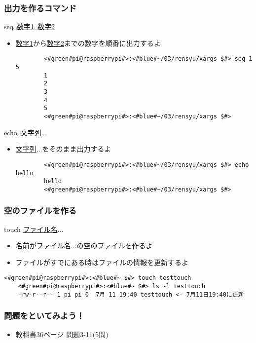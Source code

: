 \begin{frame}[fragile]
    \frametitle{出力を作るコマンド}
    seq␣\underline{数字1}␣\underline{数字2}
    \begin{itemize}
        \item \underline{数字1}から\underline{数字2}までの数字を順番に出力するよ
        \begin{lstlisting}
        <#green#pi@raspberrypi#>:<#blue#~/03/rensyu/xargs $#> seq 1 5
        1
        2
        3
        4
        5
        <#green#pi@raspberrypi#>:<#blue#~/03/rensyu/xargs $#>
        \end{lstlisting}
    \end{itemize}
    echo␣\underline{文字列}$\ldots$
    \begin{itemize}
        \item \underline{文字列}$\ldots$をそのまま出力するよ
        \begin{lstlisting}
        <#green#pi@raspberrypi#>:<#blue#~/03/rensyu/xargs $#> echo hello
        hello
        <#green#pi@raspberrypi#>:<#blue#~/03/rensyu/xargs $#>
        \end{lstlisting}
    \end{itemize}
\end{frame}

\begin{frame}[fragile]
    \frametitle{空のファイルを作る}
    touch \underline{ファイル名}$\ldots$
    \begin{itemize}
        \item 名前が\underline{ファイル名}$\ldots$の空のファイルを作るよ
        \item ファイルがすでにある時はファイルの情報を更新するよ
    \end{itemize}
    \begin{lstlisting}[title=空のファイルを作成, label=cmd:touch]
    <#green#pi@raspberrypi#>:<#blue#~ $#> touch testtouch
    <#green#pi@raspberrypi#>:<#blue#~ $#> ls -l testtouch
    -rw-r--r-- 1 pi pi 0  7月 11 19:40 testtouch <- 7月11日19:40に更新
    \end{lstlisting}
\end{frame}

\begin{frame}
    \frametitle{問題をといてみよう！}
    \begin{itemize}
        \item 教科書36ページ 問題3-11(5問)
    \end{itemize}
\end{frame}

